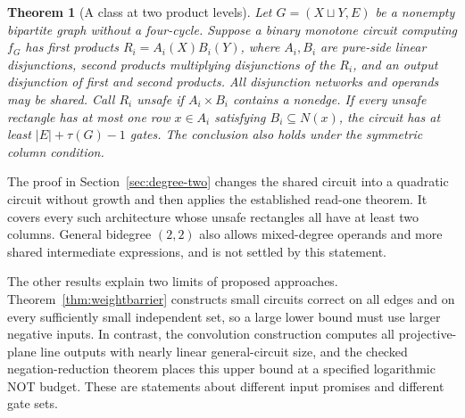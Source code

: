 \documentclass[11pt]{article}
\newtheorem{theorem}{Theorem}[section]
\theoremstyle{definition}
\begin{document}
\begin{theorem}[A class at two product levels]\label{thm:bilinear-summary}
Let $G=(X\sqcup Y,E)$ be a nonempty bipartite graph without a four-cycle. Suppose a binary monotone circuit computing $f_G$ has first products $R_i=A_i(X)B_i(Y)$, where $A_i,B_i$ are pure-side linear disjunctions, second products multiplying disjunctions of the $R_i$, and an output disjunction of first and second products. All disjunction networks and operands may be shared. Call $R_i$ unsafe if $A_i\times B_i$ contains a nonedge. If every unsafe rectangle has at most one row $x\in A_i$ satisfying $B_i\subseteq N(x)$, the circuit has at least $|E|+\tau(G)-1$ gates. The conclusion also holds under the symmetric column condition.
\end{theorem}
The proof in Section~\ref{sec:degree-two} changes the shared circuit into a quadratic circuit without growth and then applies the established read-one theorem. It covers every such architecture whose unsafe rectangles all have at least two columns. General bidegree $(2,2)$ also allows mixed-degree operands and more shared intermediate expressions, and is not settled by this statement.

The other results explain two limits of proposed approaches. Theorem~\ref{thm:weightbarrier} constructs small circuits correct on all edges and on every sufficiently small independent set, so a large lower bound must use larger negative inputs. In contrast, the convolution construction computes all projective-plane line outputs with nearly linear general-circuit size, and the checked negation-reduction theorem places this upper bound at a specified logarithmic NOT budget. These are statements about different input promises and different gate sets.
\end{document}

